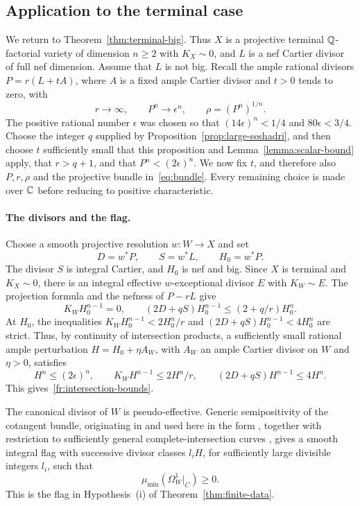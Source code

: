 \subsection{Application to the terminal case}
\label{fr:application}

We return to Theorem~\ref{thm:terminal-big}. Thus $X$ is a projective
terminal $\mathbb Q$-factorial variety of dimension $n\ge2$ with
$K_X\sim0$, and $L$ is a nef Cartier divisor of full nef dimension.
Assume that $L$ is not big. Recall the ample rational divisors
$P=r(L+tA)$, where $A$ is a fixed ample Cartier divisor and $t>0$
tends to zero, with
\[
 r\longrightarrow\infty,\qquad P^n\longrightarrow\epsilon^n,
 \qquad \rho=(P^n)^{1/n}.
\]
The positive rational number $\epsilon$ was chosen so that
$(14\epsilon)^n<1/4$ and $80\epsilon<3/4$. Choose the integer $q$
supplied by Proposition~\ref{prop:large-seshadri}, and then choose
$t$ sufficiently small that this proposition and
Lemma~\ref{lemma:scalar-bound} apply, that $r>q+1$, and that
$P^n<(2\epsilon)^n$. We now fix $t$, and therefore also $P,r,\rho$
and the projective bundle in~\eqref{eq:bundle}. Every remaining
choice is made over $\mathbb C$ before reducing to positive characteristic.

\paragraph{The divisors and the flag.}
Choose a smooth projective resolution $w:W\to X$ and set
\[
 D=w^*P,\qquad S=w^*L,\qquad H_0=w^*P.
\]
The divisor $S$ is integral Cartier, and $H_0$ is nef and big.
Since $X$ is terminal and $K_X\sim0$, there is an integral
effective $w$-exceptional divisor $E$ with $K_W\sim E$. The
projection formula and the nefness of $P-rL$ give
\[
 K_WH_0^{n-1}=0,\qquad
 (2D+qS)H_0^{n-1}\le(2+q/r)H_0^n.
\]
At $H_0$, the inequalities
$K_WH_0^{n-1}<2H_0^n/r$ and
$(2D+qS)H_0^{n-1}<4H_0^n$ are strict. Thus, by continuity of
intersection products, a sufficiently small rational ample
perturbation $H=H_0+\eta A_W$, with $A_W$ an ample Cartier divisor
on $W$ and $\eta>0$, satisfies
\[
 H^n\le(2\epsilon)^n,\qquad
 K_WH^{n-1}\le2H^n/r,\qquad
 (2D+qS)H^{n-1}\le4H^n.
\]
This gives~\eqref{fr:intersection-bounds}.

The canonical divisor of $W$ is pseudo-effective. Generic
semipositivity of the cotangent bundle, originating in \cite{Miyaoka}
and used here in the form \cite[Theorem~2.1]{CP}, together with
restriction to sufficiently general complete-intersection curves
\cite[Theorem~6.1]{MR}, gives a smooth integral flag with
successive divisor classes $l_iH$, for sufficiently large divisible
integers $l_i$, such that
\[
 \mu_{\min}(\Omega_W^1|_C)\ge0.
\]
This is the flag in Hypothesis~\textup{(i)} of
Theorem~\ref{thm:finite-data}.

